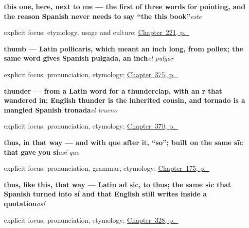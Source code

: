 \noindent\begin{minipage}[t]{\linewidth}
\raggedright
\textbf{this one, here, next to me — the first of three words for pointing, and the reason Spanish never needs to say \textquotedblleft{}the this book\textquotedblright{}}\enspace\emph{este}\par
\footnotesize explicit focus: etymology, usage and culture; \hyperref[ch:este]{Chapter~221, p.~\pageref*{ch:este}}
\end{minipage}\par\smallskip

\noindent\begin{minipage}[t]{\linewidth}
\raggedright
\textbf{thumb — Latin pollicaris, which meant an inch long, from pollex; the same word gives Spanish pulgada, an inch}\enspace\emph{el pulgar}\par
\footnotesize explicit focus: pronunciation, etymology; \hyperref[ch:la-una-y-el-labio]{Chapter~375, p.~\pageref*{ch:la-una-y-el-labio}}
\end{minipage}\par\smallskip

\noindent\begin{minipage}[t]{\linewidth}
\raggedright
\textbf{thunder — from a Latin word for a thunderclap, with an r that wandered in; English thunder is the inherited cousin, and tornado is a mangled Spanish tronada}\enspace\emph{el trueno}\par
\footnotesize explicit focus: pronunciation, etymology; \hyperref[ch:la-tormenta-y-el-trueno]{Chapter~370, p.~\pageref*{ch:la-tormenta-y-el-trueno}}
\end{minipage}\par\smallskip

\noindent\begin{minipage}[t]{\linewidth}
\raggedright
\textbf{thus, in that way — and with que after it, \textquotedblleft{}so\textquotedblright{}; built on the same sīc that gave you sí}\enspace\emph{así que}\par
\footnotesize explicit focus: pronunciation, grammar, etymology; \hyperref[ch:spanish-giving-reasons]{Chapter~175, p.~\pageref*{ch:spanish-giving-reasons}}
\end{minipage}\par\smallskip

\noindent\begin{minipage}[t]{\linewidth}
\raggedright
\textbf{thus, like this, that way — Latin ad sic, to thus; the same sic that Spanish turned into sí and that English still writes inside a quotation}\enspace\emph{así}\par
\footnotesize explicit focus: pronunciation, etymology; \hyperref[ch:asi-y-incluso]{Chapter~328, p.~\pageref*{ch:asi-y-incluso}}
\end{minipage}\par\smallskip

